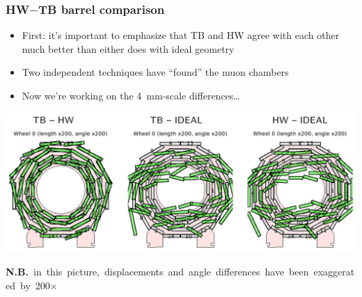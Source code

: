 \documentclass[compress]{beamer}
\begin{document}
\begin{frame}
\frametitle{HW$-$TB barrel comparison}
\begin{itemize}
\item First: it's important to emphasize that TB and HW agree with each other much better than either does with ideal geometry
\item Two independent techniques have ``found'' the muon chambers
\item Now we're working on the 4~mm-scale differences\ldots
\end{itemize}

\vfill
\includegraphics[width=\linewidth]{tb-hw_wheel0.png}

\mbox{\scriptsize {\bf N.B.} in this picture, displacements and angle differences have been exaggerated by 200$\times$\hspace{-1 cm}}
\end{frame}
\end{document}
